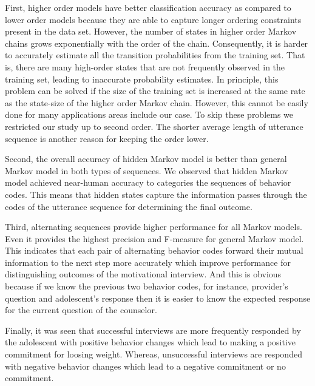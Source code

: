 \documentclass{amia}
\begin{document}
First, higher order models have better classification accuracy as compared to lower order models because they are able to capture longer ordering constraints present in the data set. However, the number of states in higher order Markov chains grows exponentially with the order of the chain. Consequently, it is harder to accurately estimate all the transition probabilities from the training set. That is, there are many high-order states that are not frequently observed in the training set, leading to inaccurate probability estimates. In principle, this problem can be solved if the size of the training set is increased at the same rate as the state-size of the higher order Markov chain. However, this cannot be easily done for many applications areas include our case. To skip these problems we restricted our study up to second order. The shorter average length of utterance sequence is another reason for keeping the order lower.  

Second, the overall accuracy of hidden Markov model is better than general Markov model in both types of sequences. We observed that hidden Markov model achieved near-human accuracy to categories the sequences of behavior codes. This means that hidden states capture the information passes through the codes of the utterance sequence for determining the final outcome. 

Third, alternating sequences provide higher performance for all Markov models. Even it provides the highest precision and F-measure for general Markov model. This indicates that each pair of alternating behavior codes forward their mutual information to the next step more accurately which improve performance for distinguishing outcomes of the motivational interview. And this is obvious because if we know the previous two behavior codes, for instance, provider's question and adolescent's response then it is easier to know the expected response for the current question of the counselor.   

Finally, it was seen that successful interviews are more frequently responded by the adolescent with positive behavior changes which lead to making a positive commitment for loosing weight. Whereas, unsuccessful interviews are responded with negative behavior changes which lead to a negative commitment or no commitment. 
\end{document}
